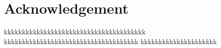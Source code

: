 \section*{Acknowledgement}
kkkkkkkkkkkkkkkkkkkkkkkkkkkkkkkkkkkkkkk
kkkkkkkkkkkkkkkkkkkkkkkkkkkkkkkkkkkkk
kkkkkkkkkkkkkkkkkkkkk
